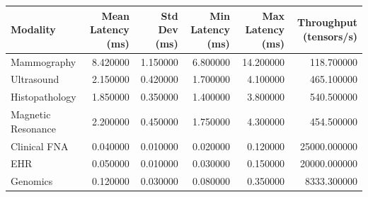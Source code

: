 \begin{tabular}{lrrrrr}
\toprule
Modality & Mean Latency (ms) & Std Dev (ms) & Min Latency (ms) & Max Latency (ms) & Throughput (tensors/s) \\
\midrule
Mammography & 8.420000 & 1.150000 & 6.800000 & 14.200000 & 118.700000 \\
Ultrasound & 2.150000 & 0.420000 & 1.700000 & 4.100000 & 465.100000 \\
Histopathology & 1.850000 & 0.350000 & 1.400000 & 3.800000 & 540.500000 \\
Magnetic Resonance & 2.200000 & 0.450000 & 1.750000 & 4.300000 & 454.500000 \\
Clinical FNA & 0.040000 & 0.010000 & 0.020000 & 0.120000 & 25000.000000 \\
EHR & 0.050000 & 0.010000 & 0.030000 & 0.150000 & 20000.000000 \\
Genomics & 0.120000 & 0.030000 & 0.080000 & 0.350000 & 8333.300000 \\
\bottomrule
\end{tabular}
